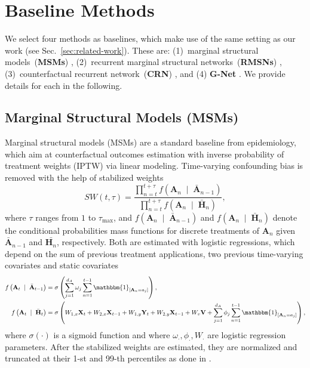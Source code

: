 \documentclass{article}
\theoremstyle{plain}
\theoremstyle{definition}
\theoremstyle{remark}
\begin{document}
\clearpage
\section{Baseline Methods}  \label{app:baselines}

We select four methods as baselines, which make use of the same setting as our work (see Sec.~\ref{sec:related-work}). These are: (1)~marginal structural models~(\textbf{MSMs}) \cite{robins2000marginal, hernan2001marginal}, (2)~recurrent marginal structural networks~(\textbf{RMSNs}) \cite{lim2018forecasting}, (3)~counterfactual recurrent network~(\textbf{CRN}) \cite{bica2020estimating}, and (4) \textbf{G-Net} \cite{li2021g}. We provide details for each in the following.

\subsection{Marginal Structural Models (MSMs)}

Marginal structural models (MSMs) \cite{robins2000marginal, hernan2001marginal} are a standard baseline from epidemiology, which aim at counterfactual outcomes estimation with inverse probability of treatment weights (IPTW) via linear modeling. Time-varying confounding bias is removed with the help of stabilized weights
\begin{equation}
    \label{eq:sw}
    SW(t, \tau) = \frac{\prod_{n=t}^{t+\tau} f\left(\mathbf{A}_n  \;\mid\;  \bar{\mathbf{A}}_{n-1}\right)}{\prod_{n=t}^{t+\tau} f\left(\mathbf{A}_n  \;\mid\;  \bar{\mathbf{H}}_{n} \right)} ,
\end{equation}
where $\tau$ ranges from $1$ to $\tau_{\text{max}}$, and $f\left(\mathbf{A}_n  \;\mid\;  \bar{\mathbf{A}}_{n-1}\right)$ and $f\left(\mathbf{A}_n  \;\mid\;  \bar{\mathbf{H}}_{n} \right)$ denote the conditional probabilities mass functions for discrete treatments of $\mathbf{A}_n$ given $\bar{\mathbf{A}}_{n-1}$ and $\bar{\mathbf{H}_{n}}$, respectively. Both are estimated with logistic regressions, which depend on the sum of previous treatment applications, two previous time-varying covariates and static covariates
\begin{align}
    f\left(\mathbf{A}_t  \;\mid\;  \bar{\mathbf{A}}_{t-1}\right) & = \sigma \left( \sum_{j=1}^{d_A} \omega_j \sum_{n=1}^{t-1} \mathbbm{1}_{[\mathbf{A}_n = a_j]} \right), \\
    \label{eq:msm-history}
    f\left(\mathbf{A}_t  \;\mid\;  \bar{\mathbf{H}}_{t} \right) & = \sigma \left(W_{1,x} \textbf{X}_t + W_{2,x} \textbf{X}_{t-1} + W_{1,y} \textbf{Y}_t + W_{2,y} \textbf{X}_{t-1} + W_{v} \textbf{V} +   \sum_{j=1}^{d_A} \phi_j \sum_{n=1}^{t-1} \mathbbm{1}_{[\mathbf{A}_n = a_j]} \right),
\end{align}
where $\sigma(\cdot)$ is a sigmoid function and where $\omega_{\cdot}, \phi_{\cdot}, W_{\cdot}$ are logistic regression parameters. After the stabilized weights are estimated, they are normalized and truncated at their 1-st and 99-th percentiles as done in \cite{lim2018forecasting}.
\end{document}
